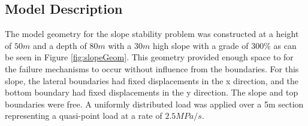 \subsection{Model Description}

The model geometry for the slope stability problem was constructed at a height of $50m$ and a depth of $80m$ with a $30m$ high slope with a grade of $300\%$ as can be seen in Figure \ref{fig:slopeGeom}. This geometry provided enough space to for the failure mechanisms to occur without influence from the boundaries. For this slope, the lateral boundaries had fixed displacements in the x direction, and the bottom boundary had fixed displacements in the y direction. The slope and top boundaries were free. A uniformly distributed load was applied over a 5m section representing a quasi-point load at a rate of $2.5 MPa/s$. 

